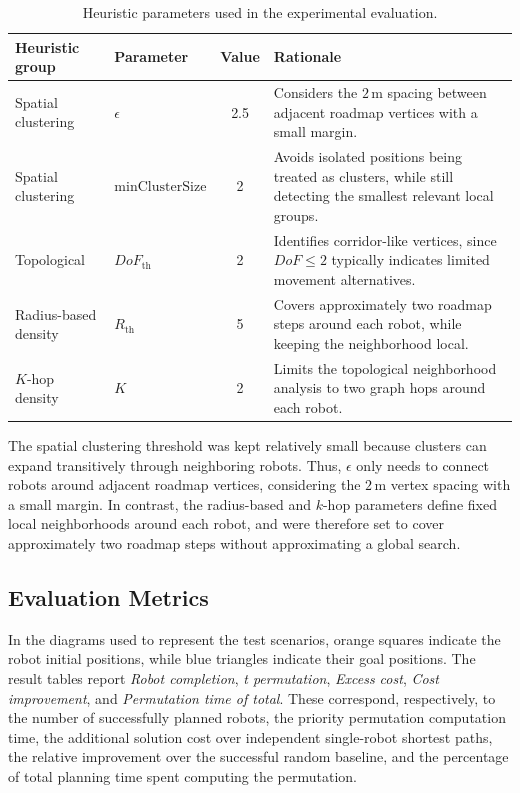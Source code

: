 \begin{table}[H]
\centering
\caption{Heuristic parameters used in the experimental evaluation.}
\label{tab:heuristic_parameters}
\footnotesize
\setlength{\tabcolsep}{4pt}
\begin{tabular}{@{}p{3.0cm}p{2.2cm}cp{6.7cm}@{}}
\toprule
\textbf{Heuristic group} & \textbf{Parameter} & \textbf{Value} & \textbf{Rationale} \\
\midrule
Spatial clustering & \(\epsilon\) & 2.5 &
Considers the \(2\,\mathrm{m}\) spacing between adjacent roadmap vertices with a small margin. \\
\midrule
Spatial clustering & \(\mathrm{minClusterSize}\) & 2 &
Avoids isolated positions being treated as clusters, while still detecting the smallest relevant local groups. \\
\midrule
Topological & \(DoF_{\mathrm{th}}\) & 2 &
Identifies corridor-like vertices, since \(DoF \leq 2\) typically indicates limited movement alternatives. \\
\midrule
Radius-based density & \(R_{\mathrm{th}}\) & 5 &
Covers approximately two roadmap steps around each robot, while keeping the neighborhood local. \\
\midrule
\(K\)-hop density & \(K\) & 2 &
Limits the topological neighborhood analysis to two graph hops around each robot. \\
\bottomrule
\end{tabular}
\end{table}

The spatial clustering threshold was kept relatively small because clusters can expand transitively
through neighboring robots. Thus, \(\epsilon\) only needs to connect robots around adjacent
roadmap vertices, considering the \(2\,\mathrm{m}\) vertex spacing with a small margin. In contrast,
the radius-based and \(k\)-hop parameters define fixed local neighborhoods around each robot, and
were therefore set to cover approximately two roadmap steps without approximating a global search.


\subsection{Evaluation Metrics}
\label{subsec:heuristic_metrics_baseline}
\hspace{\parindent}
In the diagrams used to represent the test scenarios, orange squares indicate the robot initial
positions, while blue triangles indicate their goal positions. The result tables report
\textit{Robot completion}, \textit{t permutation}, \textit{Excess cost}, \textit{Cost improvement}, and
\textit{Permutation time of total}. These correspond, respectively, to the number of successfully planned
robots, the priority permutation computation time, the additional solution cost over independent
single-robot shortest paths, the relative improvement over the successful random baseline, and the
percentage of total planning time spent computing the permutation.


